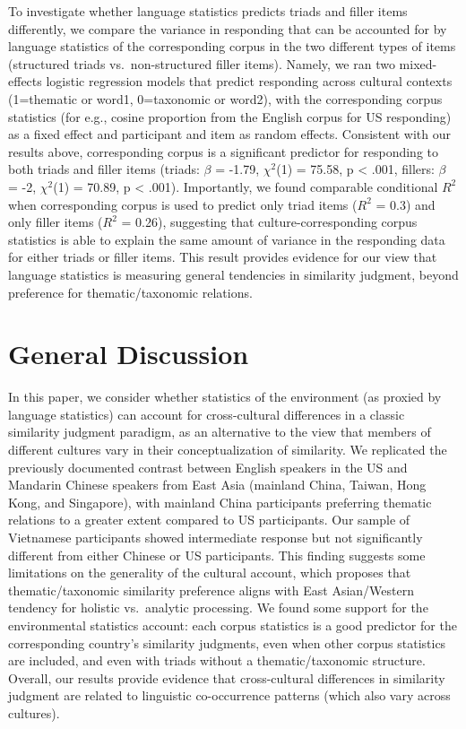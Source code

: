 \documentclass[10pt, letterpaper]{article}
\begin{document}
To investigate whether language statistics predicts triads and filler
items differently, we compare the variance in responding that can be
accounted for by language statistics of the corresponding corpus in the
two different types of items (structured triads vs.~non-structured
filler items). Namely, we ran two mixed-effects logistic regression
models that predict responding across cultural contexts (1=thematic or
word1, 0=taxonomic or word2), with the corresponding corpus statistics
(for e.g., cosine proportion from the English corpus for US responding)
as a fixed effect and participant and item as random effects. Consistent
with our results above, corresponding corpus is a significant predictor
for responding to both triads and filler items (triads: \(\beta\) =
-1.79, \(\chi^2\)(1) = 75.58, p \textless{} .001, fillers: \(\beta\) =
-2, \(\chi^2\)(1) = 70.89, p \textless{} .001). Importantly, we found
comparable conditional \(R^2\) when corresponding corpus is used to
predict only triad items (\(R^2\) = 0.3) and only filler items (\(R^2\)
= 0.26), suggesting that culture-corresponding corpus statistics is able
to explain the same amount of variance in the responding data for either
triads or filler items. This result provides evidence for our view that
language statistics is measuring general tendencies in similarity
judgment, beyond preference for thematic/taxonomic relations.

\hypertarget{general-discussion}{%
\section{General Discussion}\label{general-discussion}}

In this paper, we consider whether statistics of the environment (as
proxied by language statistics) can account for cross-cultural
differences in a classic similarity judgment paradigm, as an alternative
to the view that members of different cultures vary in their
conceptualization of similarity. We replicated the previously documented
contrast between English speakers in the US and Mandarin Chinese
speakers from East Asia (mainland China, Taiwan, Hong Kong, and
Singapore), with mainland China participants preferring thematic
relations to a greater extent compared to US participants. Our sample of
Vietnamese participants showed intermediate response but not
significantly different from either Chinese or US participants. This
finding suggests some limitations on the generality of the cultural
account, which proposes that thematic/taxonomic similarity preference
aligns with East Asian/Western tendency for holistic vs.~analytic
processing. We found some support for the environmental statistics
account: each corpus statistics is a good predictor for the
corresponding country's similarity judgments, even when other corpus
statistics are included, and even with triads without a
thematic/taxonomic structure. Overall, our results provide evidence that
cross-cultural differences in similarity judgment are related to
linguistic co-occurrence patterns (which also vary across cultures).
\end{document}
